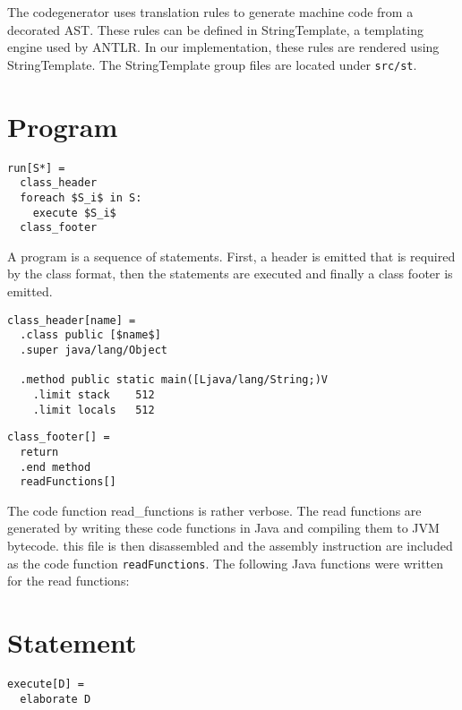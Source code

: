 The codegenerator uses translation rules to generate machine code from a decorated AST. These rules can be defined in StringTemplate, a templating engine used by ANTLR. In our implementation, these rules are rendered using StringTemplate. The StringTemplate group files are located under \texttt{src/st}.

\lstset{
mathescape = true
}

\section{Program}
\begin{lstlisting}
run[S*] =
  class_header
  foreach $S_i$ in S:
    execute $S_i$
  class_footer
\end{lstlisting}  
A program is a sequence of statements. First, a header is emitted that is required by the class format, then the statements are executed and finally a class footer is emitted.

\begin{lstlisting}
class_header[name] =
  .class public [$name$]
  .super java/lang/Object

  .method public static main([Ljava/lang/String;)V
    .limit stack 	512
    .limit locals 	512
\end{lstlisting}


\begin{lstlisting}
class_footer[] =
  return
  .end method
  readFunctions[]
\end{lstlisting}

The code function read_functions is rather verbose. The read functions are generated by writing these code functions in Java and compiling them to JVM bytecode. this file is then disassembled and the assembly instruction are included as the code function \texttt{readFunctions}. The following Java functions were written for the read functions:




\section{Statement}
\begin{lstlisting}
execute[D] = 
  elaborate D
\end{lstlisting}

